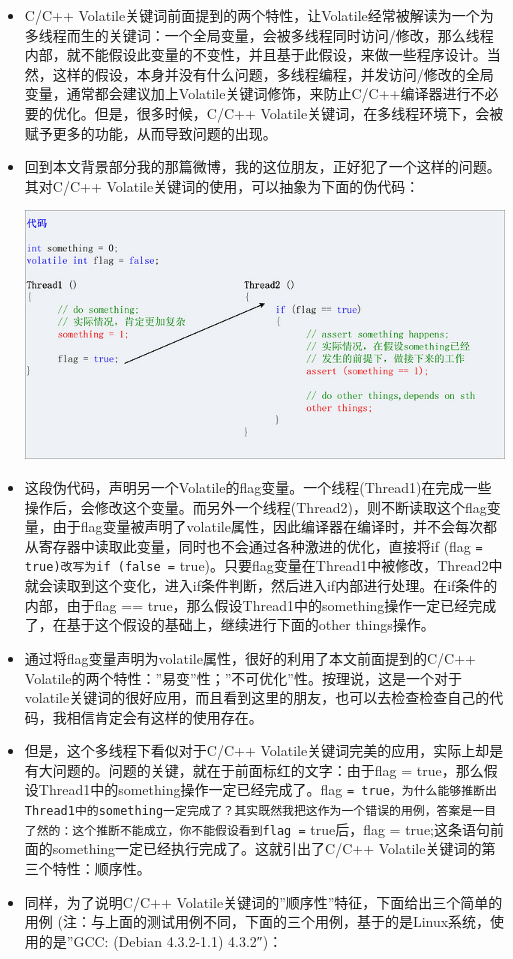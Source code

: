 \documentclass[9pt,b5paper]{article}
\begin{document}
\begin{itemize}
\item C/C++ Volatile关键词前面提到的两个特性，让Volatile经常被解读为一个为多线程而生的关键词：一个全局变量，会被多线程同时访问/修改，那么线程内部，就不能假设此变量的不变性，并且基于此假设，来做一些程序设计。当然，这样的假设，本身并没有什么问题，多线程编程，并发访问/修改的全局变量，通常都会建议加上Volatile关键词修饰，来防止C/C++编译器进行不必要的优化。但是，很多时候，C/C++ Volatile关键词，在多线程环境下，会被赋予更多的功能，从而导致问题的出现。
\item 回到本文背景部分我的那篇微博，我的这位朋友，正好犯了一个这样的问题。其对C/C++ Volatile关键词的使用，可以抽象为下面的伪代码：

\includegraphics[width=.9\linewidth]{../pic/v5.jpg}
\item 这段伪代码，声明另一个Volatile的flag变量。一个线程(Thread1)在完成一些操作后，会修改这个变量。而另外一个线程(Thread2)，则不断读取这个flag变量，由于flag变量被声明了volatile属性，因此编译器在编译时，并不会每次都从寄存器中读取此变量，同时也不会通过各种激进的优化，直接将if (flag \texttt{= true)改写为if (false =} true)。只要flag变量在Thread1中被修改，Thread2中就会读取到这个变化，进入if条件判断，然后进入if内部进行处理。在if条件的内部，由于flag == true，那么假设Thread1中的something操作一定已经完成了，在基于这个假设的基础上，继续进行下面的other things操作。
\item 通过将flag变量声明为volatile属性，很好的利用了本文前面提到的C/C++ Volatile的两个特性：”易变”性；”不可优化”性。按理说，这是一个对于volatile关键词的很好应用，而且看到这里的朋友，也可以去检查检查自己的代码，我相信肯定会有这样的使用存在。
\item 但是，这个多线程下看似对于C/C++ Volatile关键词完美的应用，实际上却是有大问题的。问题的关键，就在于前面标红的文字：由于flag = true，那么假设Thread1中的something操作一定已经完成了。flag \texttt{= true，为什么能够推断出Thread1中的something一定完成了？其实既然我把这作为一个错误的用例，答案是一目了然的：这个推断不能成立，你不能假设看到flag =} true后，flag = true;这条语句前面的something一定已经执行完成了。这就引出了C/C++ Volatile关键词的第三个特性：顺序性。
\item 同样，为了说明C/C++ Volatile关键词的”顺序性”特征，下面给出三个简单的用例 (注：与上面的测试用例不同，下面的三个用例，基于的是Linux系统，使用的是”GCC: (Debian 4.3.2-1.1) 4.3.2″)：
\end{itemize}
\end{document}
